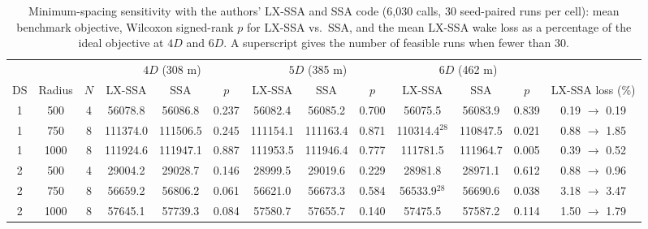 \begin{table}[!t]
\centering
\caption{Minimum-spacing sensitivity with the authors' LX-SSA and SSA code (6,030 calls, 30 seed-paired runs per cell): mean benchmark objective, Wilcoxon signed-rank $p$ for LX-SSA vs.\ SSA, and the mean LX-SSA wake loss as a percentage of the ideal objective at $4D$ and $6D$. A superscript gives the number of feasible runs when fewer than 30.}
\label{tab:spacing-authors}
\footnotesize\setlength{\tabcolsep}{3pt}
\begin{tabular}{ccccccccccccc}
\toprule
& & & \multicolumn{3}{c}{$4D$ (308 m)} & \multicolumn{3}{c}{$5D$ (385 m)} & \multicolumn{3}{c}{$6D$ (462 m)} & \\
\cmidrule(lr){4-6}\cmidrule(lr){7-9}\cmidrule(lr){10-12}
DS & Radius & $N$ & LX-SSA & SSA & $p$ & LX-SSA & SSA & $p$ & LX-SSA & SSA & $p$ & LX-SSA loss (\%) \\
\midrule
1 & 500 & 4 & 56078.8 & 56086.8 & 0.237 & 56082.4 & 56085.2 & 0.700 & 56075.5 & 56083.9 & 0.839 & 0.19 $\rightarrow$ 0.19 \\
1 & 750 & 8 & 111374.0 & 111506.5 & 0.245 & 111154.1 & 111163.4 & 0.871 & 110314.4$^{28}$ & 110847.5 & 0.021 & 0.88 $\rightarrow$ 1.85 \\
1 & 1000 & 8 & 111924.6 & 111947.1 & 0.887 & 111953.5 & 111946.4 & 0.777 & 111781.5 & 111964.7 & 0.005 & 0.39 $\rightarrow$ 0.52 \\
2 & 500 & 4 & 29004.2 & 29028.7 & 0.146 & 28999.5 & 29019.6 & 0.229 & 28981.8 & 28971.1 & 0.612 & 0.88 $\rightarrow$ 0.96 \\
2 & 750 & 8 & 56659.2 & 56806.2 & 0.061 & 56621.0 & 56673.3 & 0.584 & 56533.9$^{28}$ & 56690.6 & 0.038 & 3.18 $\rightarrow$ 3.47 \\
2 & 1000 & 8 & 57645.1 & 57739.3 & 0.084 & 57580.7 & 57655.7 & 0.140 & 57475.5 & 57587.2 & 0.114 & 1.50 $\rightarrow$ 1.79 \\
\bottomrule
\end{tabular}
\end{table}

